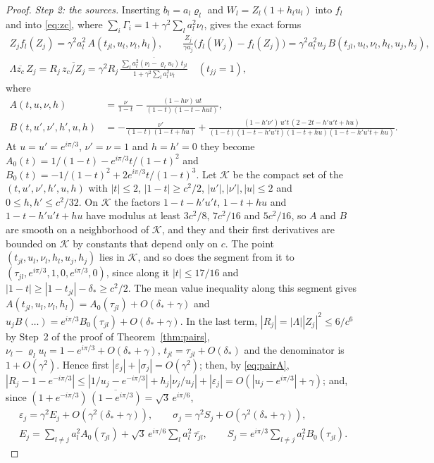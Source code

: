 \documentclass[11pt]{article}
\theoremstyle{definition}
\begin{document}
\begin{proof}
\emph{Step 2: the sources.} Inserting $b_l = a_l\varrho_l$ and $W_l = Z_l(1 + h_lu_l)$ into $f_l$ and into \eqref{eq:zc}, where $\sum_i\Gamma_i = 1 + \gamma^2\sum_l a_l^2\nu_l$, gives the exact forms
\begin{gather*}
  Z_jf_l(Z_j) = \gamma^2a_l^2\,A(t_{jl}, u_l, \nu_l, h_l), \qquad
  \frac{Z_j}{\gamma a_j}\bigl(f_l(W_j) - f_l(Z_j)\bigr) = \gamma^2a_l^2u_j\,B(t_{jl}, u_l, \nu_l, h_l, u_j, h_j),\\
  \Lambda\overline{z_c}\,Z_j = R_j\,\overline{z_c/Z_j} = \gamma^2R_j\,\frac{\overline{\sum_l a_l^2(\nu_l - \varrho_lu_l)\,t_{jl}}}{1 + \gamma^2\sum_l a_l^2\nu_l}\quad(t_{jj} = 1),
\end{gather*}
where
\begin{align*}
  A(t, u, \nu, h) &= \frac{\nu}{1 - t} - \frac{(1 - h\nu)\,ut}{(1 - t)(1 - t - hut)},\\
  B(t, u', \nu', h', u, h) &= -\frac{\nu'}{(1 - t)(1 - t + hu)} + \frac{(1 - h'\nu')\,u't\,(2 - 2t - h'u't + hu)}{(1 - t)(1 - t - h'u't)(1 - t + hu)(1 - t - h'u't + hu)}.
\end{align*}
At $u = u' = e^{i\pi/3}$, $\nu' = \nu = 1$ and $h = h' = 0$ they become $A_0(t) = 1/(1 - t) - e^{i\pi/3}t/(1 - t)^2$ and $B_0(t) = -1/(1 - t)^2 + 2e^{i\pi/3}t/(1 - t)^3$. Let $\mathcal{K}$ be the compact set of the $(t, u', \nu', h', u, h)$ with $|t| \le 2$, $|1 - t| \ge c^2/2$, $|u'|, |\nu'|, |u| \le 2$ and $0 \le h, h' \le c^2/32$. On $\mathcal{K}$ the factors $1 - t - h'u't$, $1 - t + hu$ and $1 - t - h'u't + hu$ have modulus at least $3c^2/8$, $7c^2/16$ and $5c^2/16$, so $A$ and $B$ are smooth on a neighborhood of $\mathcal{K}$, and they and their first derivatives are bounded on $\mathcal{K}$ by constants that depend only on $c$. The point $(t_{jl}, u_l, \nu_l, h_l, u_j, h_j)$ lies in $\mathcal{K}$, and so does the segment from it to $(\tau_{jl}, e^{i\pi/3}, 1, 0, e^{i\pi/3}, 0)$, since along it $|t| \le 17/16$ and $|1 - t| \ge |1 - t_{jl}| - \delta_* \ge c^2/2$. The mean value inequality along this segment gives $A(t_{jl}, u_l, \nu_l, h_l) = A_0(\tau_{jl}) + O(\delta_* + \gamma)$ and $u_jB(\ldots) = e^{i\pi/3}B_0(\tau_{jl}) + O(\delta_* + \gamma)$. In the last term, $|R_j| = |\Lambda||Z_j|^2 \le 6/c^6$ by Step~2 of the proof of Theorem~\ref{thm:pairs}, $\nu_l - \varrho_lu_l = 1 - e^{i\pi/3} + O(\delta_* + \gamma)$, $t_{jl} = \tau_{jl} + O(\delta_*)$ and the denominator is $1 + O(\gamma^2)$. Hence first $|\varepsilon_j| + |\sigma_j| = O(\gamma^2)$; then, by \eqref{eq:pairA}, $|R_j - 1 - e^{-i\pi/3}| \le |1/u_j - e^{-i\pi/3}| + h_j|\nu_j/u_j| + |\varepsilon_j| = O(|u_j - e^{i\pi/3}| + \gamma)$; and, since $(1 + e^{-i\pi/3})\,\overline{(1 - e^{i\pi/3})} = \sqrt{3}\,e^{i\pi/6}$,
\begin{equation}\label{eq:sources}
\begin{gathered}
  \varepsilon_j = \gamma^2E_j + O(\gamma^2(\delta_* + \gamma)), \qquad \sigma_j = \gamma^2S_j + O(\gamma^2(\delta_* + \gamma)),\\
  E_j = \sum_{l \ne j} a_l^2A_0(\tau_{jl}) + \sqrt{3}\,e^{i\pi/6}\sum_l a_l^2\,\overline{\tau_{jl}}, \qquad S_j = e^{i\pi/3}\sum_{l \ne j} a_l^2B_0(\tau_{jl}).
\end{gathered}
\end{equation}


\end{proof}
\end{document}

